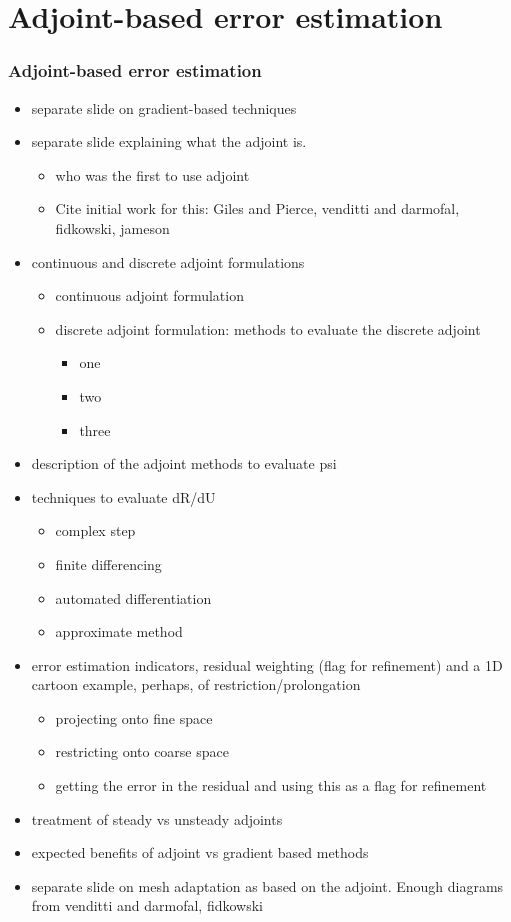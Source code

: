 \documentclass{beamer}
\begin{document}
\section[Adjoint]{Adjoint-based error estimation}

\begin{frame}[allowframebreaks]
\frametitle{Adjoint-based error estimation}
\begin{itemize}
\item separate slide on gradient-based techniques
\item separate slide explaining what the adjoint is. 
\begin{itemize}
\item who was the first to use adjoint
\item Cite initial work for this: Giles and Pierce, venditti and darmofal, fidkowski, jameson
\end{itemize}
\item continuous and discrete adjoint formulations
\begin{itemize}
\item continuous adjoint formulation
\item discrete adjoint formulation: methods to evaluate the discrete adjoint
\begin{itemize}
\item one
\item two
\item three
\end{itemize}
\end{itemize}
\item description of the adjoint methods to evaluate psi
\item techniques to evaluate dR/dU
\begin{itemize}
\item complex step
\item finite differencing
\item automated differentiation
\item approximate method
\end{itemize}
\item error estimation indicators, residual weighting (flag for refinement) and a 1D cartoon example, perhaps, of restriction/prolongation
\begin{itemize}
\item projecting onto fine space
\item restricting onto coarse space
\item getting the error in the residual and using this as a flag for refinement
\end{itemize}
\item treatment of steady vs unsteady adjoints
\item expected benefits of adjoint vs gradient based methods
\item separate slide on mesh adaptation as based on the adjoint. Enough diagrams from venditti and darmofal, fidkowski
\end{itemize}
\end{frame}
\end{document}
